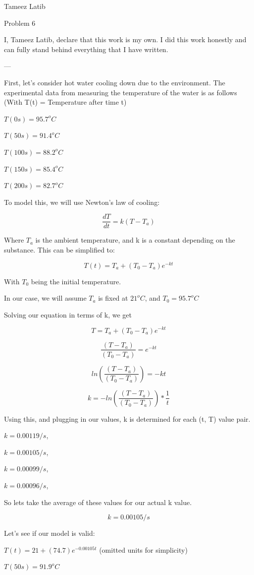 \documentclass{article}
\begin{document}
Tameez Latib

Problem 6

I, Tameez Latib, declare that this work is my own. I did this work honestly and can fully stand behind everything that I have written.

---

First, let's consider hot water cooling down due to the environment. The experimental data from measuring the temperature of the water is as follows (With T(t) = Temperature after time t)

$T(0s) =  95.7^oC$

$T(50s) =  91.4^oC$

$T(100s) =  88.2^oC$

$T(150s) =  85.4^oC$

$T(200s) =  82.7^oC$

To model this, we will use Newton's law of cooling: 

$$\frac{dT}{dt} = k(T-T_a)$$

Where $T_a$ is the ambient temperature, and k is a constant depending on the substance. This can be simplified to:

$$T(t) = T_a + (T_0 - T_a)e^{-kt}$$

With $T_0$ being the initial temperature. 

In our case, we will assume $T_a$ is fixed at $21^oC$, and $T_0 = 95.7^oC$

Solving our equation in terms of k, we get

$$T = T_a + (T_0 - T_a)e^{-kt}$$

$$\frac{(T-T_a)}{(T_0 - T_a)} = e^{-kt}$$

$$ln(\frac{(T-T_a)}{(T_0 - T_a)}) = -kt$$

$$k = -ln(\frac{(T-T_a)}{(T_0 - T_a)})*\frac{1}{t}$$

Using this, and plugging in our values, k is determined for each (t, T) value pair.

$k = 0.00119/s$,
 
$k = 0.00105/s$,

$k = 0.00099/s$, 

$k = 0.00096/s$, 

So lets take the average of these values for our actual k value.

$$k = 0.00105/s$$

Let's see if our model is valid:

$T(t) = 21 + (74.7)e^{-0.00105t}$ (omitted units for simplicity)

$T(50s) = 91.9^oC$
\end{document}
